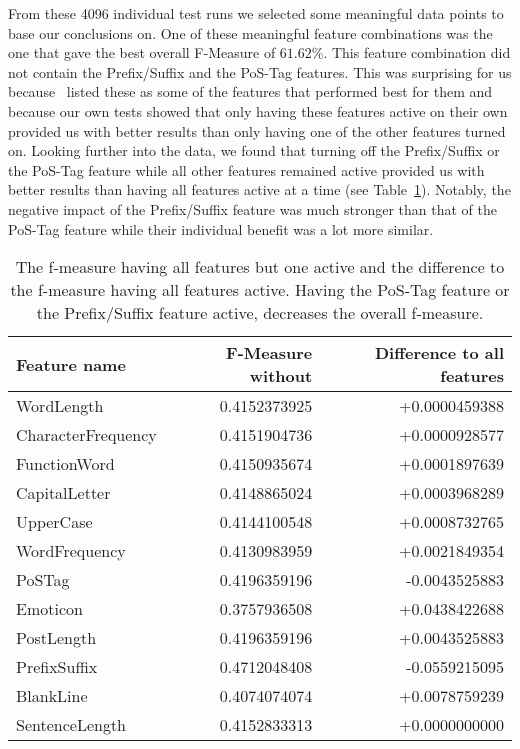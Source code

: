 From these 4096 individual test runs we selected some meaningful data points to base our conclusions on.
One of these meaningful feature combinations was the one that gave the best overall F-Measure of $61.62\%$.
This feature combination did not contain the Prefix/Suffix and the PoS-Tag features.
This was surprising for us because~\cite{madigan2005author} listed these as some of the features that performed best for them and because our own tests showed that only having these features active on their own provided us with better results than only having one of the other features turned on.
Looking further into the data, we found that turning off the Prefix/Suffix or the PoS-Tag feature while all other features remained active provided us with better results than having all features active at a time (see Table~\ref{tab:feature_evaluation_1}).
Notably, the negative impact of the Prefix/Suffix feature was much stronger than that of the PoS-Tag feature while their individual benefit was a lot more similar.

\begin{table}[h]
	\begin{center}
    \begin{tabular}{l|r|r}
	Feature name & F-Measure without & Difference to all features \\ \hline
	WordLength & 0.4152373925 & +0.0000459388 \\ \hline
	CharacterFrequency & 0.4151904736 & +0.0000928577 \\ \hline
	FunctionWord  & 0.4150935674 & +0.0001897639 \\ \hline
	CapitalLetter & 0.4148865024 & +0.0003968289 \\ \hline
	UpperCase & 0.4144100548 & +0.0008732765 \\ \hline
	WordFrequency &	0.4130983959 & +0.0021849354 \\ \hline
	PoSTag & 0.4196359196 & -0.0043525883 \\ \hline
	Emoticon &	0.3757936508 & +0.0438422688 \\ \hline
	PostLength & 0.4196359196 & +0.0043525883 \\ \hline
	PrefixSuffix & 0.4712048408 & -0.0559215095 \\ \hline
	BlankLine & 0.4074074074 & +0.0078759239 \\ \hline
	SentenceLength & 0.4152833313 & +0.0000000000 \\
    \end{tabular}
    \end{center}
	\caption{The f-measure having all features but one active and the difference to the f-measure having all features active. Having the PoS-Tag feature or the Prefix/Suffix feature active, decreases the overall f-measure.}
	\label{tab:feature_evaluation_1}
\end{table}

